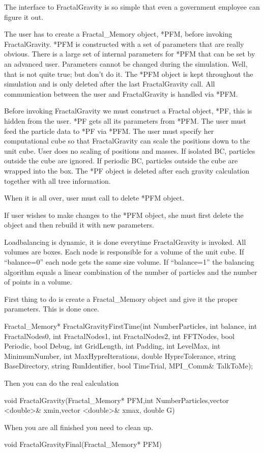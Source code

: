 The interface to FractalGravity is so simple that even a government employee can figure it out.

The user has to create a Fractal_Memory object, *PFM, before invoking FractalGravity. 
*PFM is constructed with a set of parameters that are really obvious. 
There is a large set of internal parameters for *PFM that can be set by an advanced user.
Parameters cannot be changed during the simulation. Well, that is not quite true; but don't do it.
The *PFM object is kept throughout the simulation and is only deleted after the last FractalGravity call.
All communication between the user and FractalGravity is handled via *PFM.

Before invoking FractalGravity we must construct a Fractal object, *PF, this is hidden from the user.
*PF gets all its parameters from *PFM.
The user must feed the particle data to *PF via *PFM.
The user must specify her computational cube so that FractalGravity can scale the positions down to the unit cube.
User does no scaling of positions and masses. 
If isolated BC, particles outside the cube are ignored.
If periodic BC, particles outside the cube are wrapped into the box.
The *PF object is deleted after each gravity calculation together with all tree information.

When it is all over, user must call to delete *PFM object.

If user wishes to make changes to the *PFM object, she must first delete the object and then rebuild it with new parameters.

Loadbalancing is dynamic, it is done everytime FractalGravity is invoked. All volumes are boxes.
Each node is responsible for a volume of the unit cube. If ``balance=0'' each node gets the same size volume. If ``balance=1''
the balancing algorithm equals a linear combination of the number of particles and the number of points in a volume.

First thing to do is create a Fractal_Memory object and give it the proper parameters.
This is done once.

  Fractal_Memory* FractalGravityFirstTime(int NumberParticles,
					  int balance,
					  int FractalNodes0,
					  int FractalNodes1,
					  int FractalNodes2,
					  int FFTNodes,
					  bool Periodic,
					  bool Debug,
					  int GridLength,
					  int Padding,
					  int LevelMax,
					  int MinimumNumber,
					  int MaxHypreIterations,
					  double HypreTolerance,
					  string BaseDirectory,
					  string RunIdentifier,
					  bool TimeTrial,
					  MPI_Comm& TalkToMe);

Then you can do the real calculation

  void FractalGravity(Fractal_Memory* PFM,int NumberParticles,vector <double>& xmin,vector <double>& xmax, double G)

When you are all finished you need to clean up.

  void FractalGravityFinal(Fractal_Memory* PFM)
